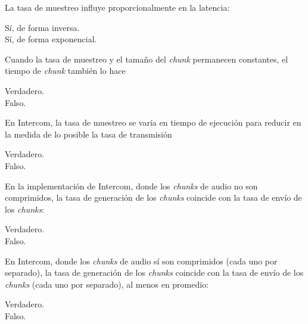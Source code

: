 \documentclass[legalpaper, 12pt, addpoints]{exam}
\begin{document}
\begin{questions}
\vspace{0.10in}

\question La tasa de muestreo influye proporcionalmente en la latencia:

\begin{oneparchoices}
  \choice Sí, de forma inversa.\\
  \choice Sí, de forma exponencial.
\end{oneparchoices}
  
\vspace{0.10in}

\question Cuando la tasa de muestreo y el tamaño del \emph{chunk}
permanecen constantes, el tiempo de \emph{chunk} también lo hace

\begin{oneparchoices}
  \choice Verdadero.\\
  \choice Falso.
\end{oneparchoices}
  
\vspace{0.10in}

\question En Intercom, la tasa de muestreo se varía en tiempo de
ejecución para reducir en la medida de lo posible la tasa de
transmisión

\begin{oneparchoices}
  \choice Verdadero.\\
  \choice Falso.
\end{oneparchoices}
  
\vspace{0.10in}

\question En la implementación de Intercom, donde los \emph{chunks} de
audio no son comprimidos, la tasa de generación de los \emph{chunks}
coincide con la tasa de envío de los \emph{chunks}:

\begin{oneparchoices}
  \choice Verdadero.\\
  \choice Falso.
\end{oneparchoices}
  
\vspace{0.10in}

\question En Intercom, donde los \emph{chunks} de audio sí son
comprimidos (cada uno por separado), la tasa de generación de los
\emph{chunks} coincide con la tasa de envío de los \emph{chunks} (cada
uno por separado), al menos en promedio:

\begin{oneparchoices}
  \choice Verdadero.\\
  \choice Falso.
\end{oneparchoices}
  

\end{questions}
\end{document}
